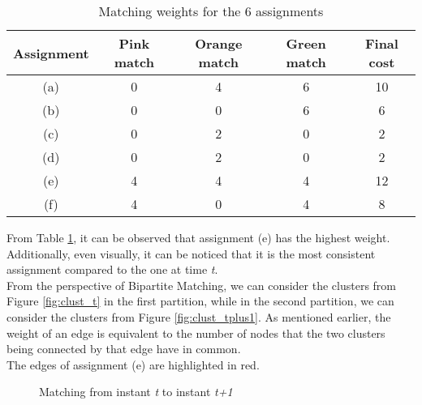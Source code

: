 \begin{table}[H]
  \centering
  \begin{tabular}{|c|c|c|c|c|}
    \hline
   \textbf{Assignment} & \textbf{Pink match} & \textbf{Orange match} & \textbf{Green match} & \textbf{Final cost} \\
    \hline
    (a) & 0 & 4 & 6 & 10 \\
    \hline
    (b) & 0 & 0 & 6 & 6 \\
    \hline
    (c) & 0 & 2 & 0 & 2 \\
    \hline
    (d) & 0 & 2 & 0 & 2 \\
    \hline
    (e) & 4 & 4 & 4 & 12 \\
    \hline
    (f) & 4 & 0 & 4 & 8 \\
    \hline
  \end{tabular}
  \caption{Matching weights for the 6 assignments}
  \label{tab:table_clust}
\end{table}
 
From Table \ref{tab:table_clust}, it can be observed that assignment (e) has the highest weight.
Additionally, even visually, it can be noticed that it is the most consistent assignment compared to the one at time \textit{t}.
\\

From the perspective of Bipartite Matching, we can consider the clusters from Figure \ref{fig:clust_t} in the first partition, while in the second partition, we can consider the clusters from Figure \ref{fig:clust_tplus1}.
As mentioned earlier, the weight of an edge is equivalent to the number of nodes that the two clusters being connected by that edge have in common. \\
The edges of assignment (e) are highlighted in red.


\begin{figure}[H]
  \centering
  \caption{Matching from instant \textit{t} to instant \textit{t+1}}
  \label{fig:clust_match}
\end{figure}



